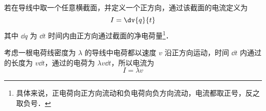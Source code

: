 
\begin{issues}
\issueDraft
\end{issues}


若在导线中取一个任意横截面，并定义一个正方向，通过该截面的电流定义为
\begin{equation}\label{I_eq1}
I = \dv{q}{t}
\end{equation}
其中 $\dd{q}$ 为 $\dd{t}$ 时间内由正方向通过截面的净电荷量\footnote{具体来说，正电荷向正方向流动和负电荷向负方向流动，电流都取正号，反之取负号．}．

考虑一根电荷线密度为 $\lambda$ 的导线中电荷都以速度 $v$ 沿正方向运动，时间 $\dd{t}$ 内通过的长度为 $v\dd{t}$，通过的电荷为 $\lambda v\dd{t}$，所以电流为
\begin{equation}
I = \lambda v
\end{equation}
